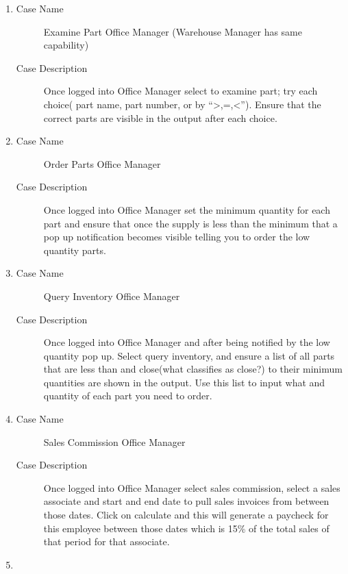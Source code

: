 \documentclass{report}
\begin{document}
\begin{enumerate}
\begin{description}
        \end{description}
  \item \begin{description}
          \item [Case Name] Examine Part Office Manager (Warehouse Manager has same capability)
          \item [Case Description] Once logged into Office Manager select to examine part; try each choice( part name, part number, or by “>,=,<”). Ensure that the correct parts are visible in the output after each choice.
        \end{description}
  \item \begin{description}
          \item [Case Name] Order Parts Office Manager
          \item [Case Description] Once logged into Office Manager set the minimum quantity for each part and ensure that once the supply is less than the minimum that a pop up notification becomes visible telling you to order the low quantity parts.
        \end{description}
  \item \begin{description}
          \item [Case Name] Query Inventory Office Manager
          \item [Case Description] Once logged into Office Manager and after being notified by the low quantity pop up. Select query inventory, and ensure a list of all parts that are less than and close(what classifies as close?) to their minimum quantities are shown in the output. Use this list to input what and quantity of each part you need to order.
        \end{description}
  \item \begin{description}
          \item [Case Name] Sales Commission Office Manager
          \item [Case Description] Once logged into Office Manager select sales commission, select a sales associate and start and end date to pull sales invoices from between those dates. Click on calculate and this will generate a paycheck for this employee between those dates which is 15\% of the total sales of that period for that associate.
        \end{description}
  \item \begin{description}

\end{description}
\end{enumerate}
\end{document}
